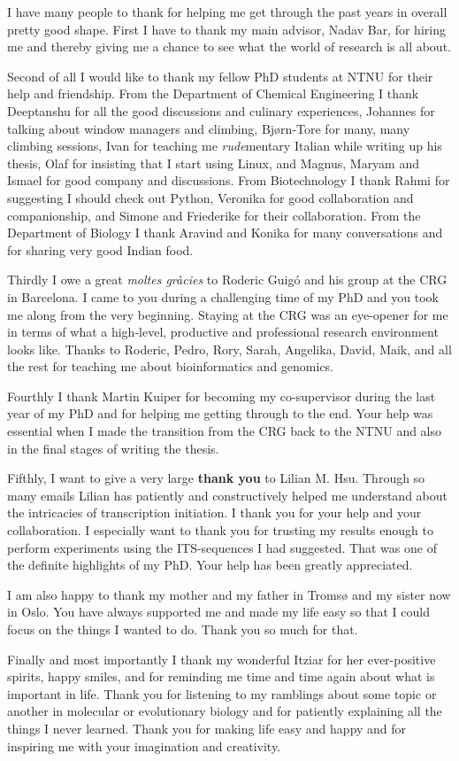 I have many people to thank for helping me get through the past years in
overall pretty good shape. First I have to thank my main advisor, Nadav Bar,
for hiring me and thereby giving me a chance to see what the world of research
is all about.

Second of all I would like to thank my fellow PhD students at NTNU for their
help and friendship. From the Department of Chemical Engineering I thank
Deeptanshu for all the good discussions and culinary experiences, Johannes for
talking about window managers and climbing, Bjørn-Tore for many, many climbing
sessions, Ivan for teaching me \textit{rude}mentary Italian while writing up his
thesis, Olaf for insisting that I start using Linux, and Magnus, Maryam and
Ismael for good company and discussions. From Biotechnology I thank Rahmi for
suggesting I should check out Python, Veronika for good collaboration and
companionship, and Simone and Friederike for their collaboration. From the
Department of Biology I thank Aravind and Konika for many conversations and for
sharing very good Indian food.

Thirdly I owe a great \textit{moltes gràcies} to Roderic Guigó and his group at
the CRG in Barcelona. I came to you during a challenging time of my PhD and you
took me along from the very beginning. Staying at the CRG was an eye-opener for
me in terms of what a high-level, productive and professional research
environment looks like. Thanks to Roderic, Pedro, Rory, Sarah, Angelika, David,
Maik, and all the rest for teaching me about bioinformatics and genomics.

Fourthly I thank Martin Kuiper for becoming my co-supervisor during the last
year of my PhD and for helping me getting through to the end. Your help was
essential when I made the transition from the CRG back to the NTNU and also in
the final stages of writing the thesis.

Fifthly, I want to give a very large \textbf{thank you} to Lilian M. Hsu.
Through so many emails Lilian has patiently and constructively helped me
understand about the intricacies of transcription initiation. I thank you for
your help and your collaboration. I especially want to thank you for trusting
my results enough to perform experiments using the ITS-sequences I had
suggested. That was one of the definite highlights of my PhD. Your help has
been greatly appreciated.

I am also happy to thank my mother and my father in Tromsø and my sister now in
Oslo. You have always supported me and made my life easy so that I could focus
on the things I wanted to do. Thank you so much for that.

Finally and most importantly I thank my wonderful Itziar for her ever-positive
spirits, happy smiles, and for reminding me time and time again about what is
important in life. Thank you for listening to my ramblings about some topic or
another in molecular or evolutionary biology and for patiently explaining all
the things I never learned. Thank you for making life easy and happy and for
inspiring me with your imagination and creativity.
